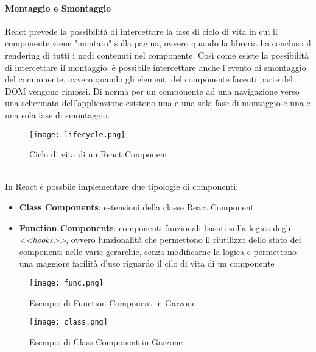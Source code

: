 \paragraph{Montaggio e Smontaggio} React prevede la possibilità di intercettare la fase di ciclo di vita in cui il componente viene "montato" sulla pagina, ovvero quando la libreria ha concluso il rendering di tutti i nodi contenuti nel componente. Così come esiste la possibilità di intercettare il montaggio, è possibile intercettare anche l'evento di smontaggio del componente, ovvero quando gli elementi del componente facenti parte del DOM vengono rimossi. Di norma per un componente ad una navigazione verso una schermata dell'applicazione esistono una e una sola fase di montaggio e una e una sola fase di smontaggio.
\begin{figure}[!htb]
    \centering
    \texttt{[image: lifecycle.png]}
    \caption{Ciclo di vita di un React Component\cite{LIFE}}
\end{figure}
\\[12pt]
In React è possbile implementare due tipologie di componenti:
\begin{itemize}
    \item \textbf{Class Components}: estensioni della classe React.Component
    \item \textbf{Function Components}: componenti funzionali basati sulla logica degli \textit{<<hooks>>}, ovvero funzionalità che permettono il riutilizzo dello stato dei componenti nelle varie gerarchie, senza modificarne la logica e permettono una maggiore facilità d'uso riguardo il cilo di vita di un componente
\end{itemize} 
\begin{figure}[!htb]
    \centering
    \texttt{[image: func.png]}
    \caption{Esempio di Function Component in Garzone}
\end{figure}
\begin{figure}[!htb]
    \centering
    \texttt{[image: class.png]}
    \caption{Esempio di Class Component in Garzone}
\end{figure}
